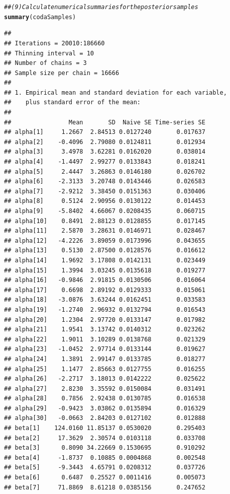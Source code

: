 \documentclass{article}\usepackage[]{graphicx}\usepackage[]{color}
\makeatletter
\newcommand{\hlcom}[1]{\textcolor[rgb]{0.678,0.584,0.686}{\textit{#1}}}%
\newcommand{\hlstd}[1]{\textcolor[rgb]{0.345,0.345,0.345}{#1}}%
\newcommand{\hlkwd}[1]{\textcolor[rgb]{0.737,0.353,0.396}{\textbf{#1}}}%
\newenvironment{kframe}{%
 \def\at@end@of@kframe{}%
 \ifinner\ifhmode%
  \def\at@end@of@kframe{\end{minipage}}%
  \begin{minipage}{\columnwidth}%
 \fi\fi%
 \def\FrameCommand##1{\hskip\@totalleftmargin \hskip-\fboxsep
 \colorbox{shadecolor}{##1}\hskip-\fboxsep
     \hskip-\linewidth \hskip-\@totalleftmargin \hskip\columnwidth}%
 \MakeFramed {\advance\hsize-\width
   \@totalleftmargin\z@ \linewidth\hsize
   \@setminipage}}%
 {\par\unskip\endMakeFramed%
 \at@end@of@kframe}
\newenvironment{knitrout}{}{} %
\makeatother
\begin{document}
\begin{knitrout}
\begin{kframe}
\begin{alltt}
\hlcom{## (9) Calculate numerical summaries for the posterior samples}
\hlkwd{summary}\hlstd{(codaSamples)}
\end{alltt}
\begin{verbatim}
## 
## Iterations = 20010:186660
## Thinning interval = 10 
## Number of chains = 3 
## Sample size per chain = 16666 
## 
## 1. Empirical mean and standard deviation for each variable,
##    plus standard error of the mean:
## 
##                Mean       SD  Naive SE Time-series SE
## alpha[1]     1.2667  2.84513 0.0127240       0.017637
## alpha[2]    -0.4096  2.79080 0.0124811       0.012934
## alpha[3]     3.4978  3.62281 0.0162020       0.038014
## alpha[4]    -1.4497  2.99277 0.0133843       0.018241
## alpha[5]     2.4447  3.26863 0.0146180       0.026702
## alpha[6]    -2.3133  3.20748 0.0143446       0.026583
## alpha[7]    -2.9212  3.38450 0.0151363       0.030406
## alpha[8]     0.5124  2.90956 0.0130122       0.014453
## alpha[9]    -5.8402  4.66067 0.0208435       0.060715
## alpha[10]    0.8491  2.88123 0.0128855       0.017145
## alpha[11]    2.5870  3.28631 0.0146971       0.028467
## alpha[12]   -4.2226  3.89059 0.0173996       0.043655
## alpha[13]    0.5130  2.87500 0.0128576       0.016612
## alpha[14]    1.9692  3.17808 0.0142131       0.023449
## alpha[15]    1.3994  3.03245 0.0135618       0.019277
## alpha[16]   -0.9846  2.91815 0.0130506       0.016064
## alpha[17]    0.6698  2.89192 0.0129333       0.015061
## alpha[18]   -3.0876  3.63244 0.0162451       0.033583
## alpha[19]   -1.2740  2.96932 0.0132794       0.016543
## alpha[20]    1.2304  2.97720 0.0133147       0.017982
## alpha[21]    1.9541  3.13742 0.0140312       0.023262
## alpha[22]    1.9011  3.10289 0.0138768       0.021329
## alpha[23]   -1.0452  2.97714 0.0133144       0.019627
## alpha[24]    1.3891  2.99147 0.0133785       0.018277
## alpha[25]    1.1477  2.85663 0.0127755       0.016255
## alpha[26]   -2.2717  3.18013 0.0142222       0.025622
## alpha[27]    2.8230  3.35592 0.0150084       0.031491
## alpha[28]    0.7856  2.92438 0.0130785       0.016538
## alpha[29]   -0.9423  3.03862 0.0135894       0.016329
## alpha[30]   -0.0663  2.84203 0.0127102       0.012888
## beta[1]    124.0160 11.85137 0.0530020       0.295403
## beta[2]     17.3629  2.30574 0.0103118       0.033708
## beta[3]      0.8090 34.22669 0.1530695       0.910292
## beta[4]     -1.8737  0.10885 0.0004868       0.002548
## beta[5]     -9.3443  4.65791 0.0208312       0.037726
## beta[6]      0.6487  0.25527 0.0011416       0.005073
## beta[7]     71.8869  8.61218 0.0385156       0.247652

\end{verbatim}
\end{kframe}
\end{knitrout}
\end{document}
